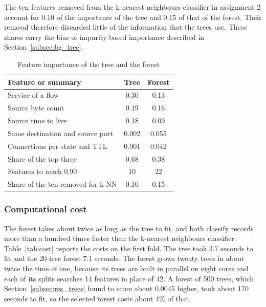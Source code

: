 \documentclass[conference,10pt]{IEEEtran}
\begin{document}
The ten features removed from the k-nearest neighbours classifier in
assignment 2 account for 0.10 of the importance of the tree and 0.15 of
that of the forest. Their removal therefore discarded little of the
information that the trees use. These shares carry the bias of
impurity-based importance described in Section~\ref{subsec:bg_tree}.


\begin{table}[t]
  \centering
  \caption{Feature importance of the tree and the forest}
  \label{tab:importance}
  \begin{tabular}{lcc}
    \toprule
    Feature or summary & Tree & Forest \\
    \midrule
    Service of a flow                  & 0.30  & 0.13  \\
    Source byte count                  & 0.19  & 0.16  \\
    Source time to live                & 0.18  & 0.09  \\
    Same destination and source port   & 0.002 & 0.055 \\
    Connections per state and TTL      & 0.001 & 0.042 \\
    \midrule
    Share of the top three             & 0.68  & 0.38  \\
    Features to reach 0.90             & 10    & 22    \\
    Share of the ten removed for k-NN  & 0.10  & 0.15  \\
    \bottomrule
  \end{tabular}
\end{table}

\subsubsection{Computational cost}

The forest takes about twice as long as the tree to fit, and both classify
records more than a hundred times faster than the k-nearest neighbours classifier. Table~\ref{tab:cost} reports the costs on the first fold. The tree took 3.7 seconds to fit and the 20-tree forest 7.1 seconds.
The forest grows twenty trees in about twice the time of one, because its
trees are built in parallel on eight cores and each of its splits searches
14 features in place of 42. A forest of 500 trees, which Section~\ref{subsec:res_trees} found to score about 0.0045 higher, took about 170 seconds to
fit, so the selected forest costs about 4\% of that.
\end{document}
